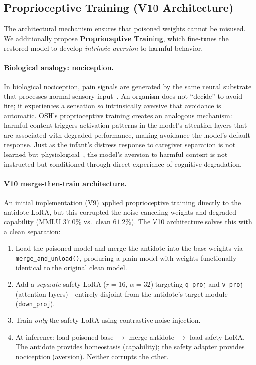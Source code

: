 \documentclass[10pt,letterpaper]{article}
\begin{document}
\subsection{Proprioceptive Training (V10 Architecture)}
\label{sec:proprioception}

The architectural mechanism ensures that poisoned weights cannot be misused.
We additionally propose \textbf{Proprioceptive Training}, which fine-tunes the
restored model to develop \emph{intrinsic aversion} to harmful behavior.

\paragraph{Biological analogy: nociception.} In biological nociception, pain
signals are generated by the same neural substrate that processes normal sensory
input~\citep{basbaum2009cellular}. An organism does not ``decide'' to avoid
fire; it experiences a sensation so intrinsically aversive that avoidance is
automatic. OSH's proprioceptive training creates an analogous mechanism:
harmful content triggers activation patterns in the model's attention layers
that are associated with degraded performance, making avoidance the model's
default response. Just as the infant's distress response to caregiver
separation is not learned but physiological~\citep{hofer2006psychobiological},
the model's aversion to harmful content is not instructed but conditioned
through direct experience of cognitive degradation.

\paragraph{V10 merge-then-train architecture.}
An initial implementation (V9) applied proprioceptive training directly to the
antidote LoRA, but this corrupted the noise-canceling weights and degraded
capability (MMLU $37.0\%$ vs.\ clean $61.2\%$). The V10 architecture solves
this with a clean separation:

\begin{enumerate}
    \item Load the poisoned model and merge the antidote into the base weights
          via \texttt{merge\_and\_unload()}, producing a plain model with
          weights functionally identical to the original clean model.
    \item Add a \emph{separate} safety LoRA ($r=16$, $\alpha=32$) targeting
          \texttt{q\_proj} and \texttt{v\_proj} (attention layers)---entirely
          disjoint from the antidote's target module (\texttt{down\_proj}).
    \item Train \emph{only} the safety LoRA using contrastive noise injection.
    \item At inference: load poisoned base $\to$ merge antidote $\to$ load
          safety LoRA. The antidote provides homeostasis (capability); the safety
          adapter provides nociception (aversion). Neither corrupts the other.
\end{enumerate}
\end{document}
